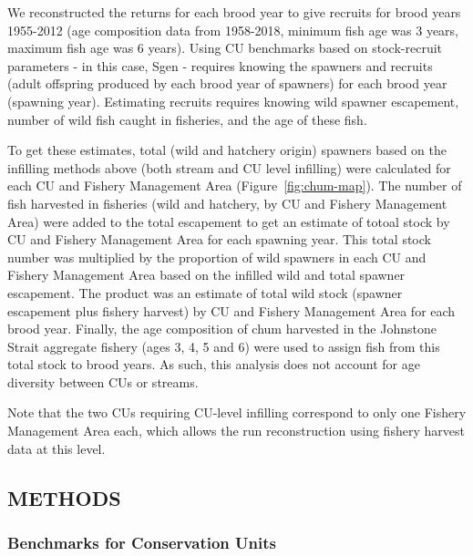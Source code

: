 \documentclass[11pt]{book}
\begin{document}
We reconstructed the returns for each brood year to give recruits for brood years 1955-2012 (age composition data from 1958-2018, minimum fish age was 3 years, maximum fish age was 6 years). Using CU benchmarks based on stock-recruit parameters - in this case, Sgen - requires knowing the spawners and recruits (adult offspring produced by each brood year of spawners) for each brood year (spawning year). Estimating recruits requires knowing wild spawner escapement, number of wild fish caught in fisheries, and the age of these fish.

To get these estimates, total (wild and hatchery origin) spawners based on the infilling methods above (both stream and CU level infilling) were calculated for each CU and Fishery Management Area (Figure~\ref{fig:chum-map}). The number of fish harvested in fisheries (wild and hatchery, by CU and Fishery Management Area) were added to the total escapement to get an estimate of totoal stock by CU and Fishery Management Area for each spawning year. This total stock number was multiplied by the proportion of wild spawners in each CU and Fishery Management Area based on the infilled wild and total spawner escapement. The product was an estimate of total wild stock (spawner escapement plus fishery harvest) by CU and Fishery Management Area for each brood year. Finally, the age composition of chum harvested in the Johnstone Strait aggregate fishery (ages 3, 4, 5 and 6) were used to assign fish from this total stock to brood years. As such, this analysis does not account for age diversity between CUs or streams.

Note that the two CUs requiring CU-level infilling correspond to only one Fishery Management Area each, which allows the run reconstruction using fishery harvest data at this level.

\hypertarget{methods-2}{%
\subsection{METHODS}\label{methods-2}}

\hypertarget{benchmarks-for-conservation-units}{%
\subsubsection{Benchmarks for Conservation Units}\label{benchmarks-for-conservation-units}}
\end{document}
